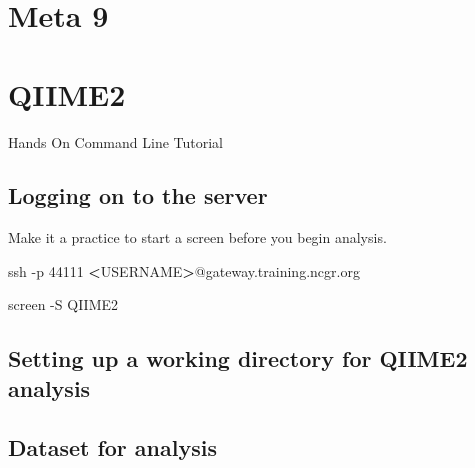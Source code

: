 \documentclass[
]{book}
\newenvironment{Shaded}{\begin{snugshade}}{\end{snugshade}}
\newcommand{\AttributeTok}[1]{\textcolor[rgb]{0.77,0.63,0.00}{#1}}
\newcommand{\BuiltInTok}[1]{#1}
\newcommand{\ExtensionTok}[1]{#1}
\newcommand{\FunctionTok}[1]{\textcolor[rgb]{0.00,0.00,0.00}{#1}}
\newcommand{\NormalTok}[1]{#1}
\newcommand{\OperatorTok}[1]{\textcolor[rgb]{0.81,0.36,0.00}{\textbf{#1}}}
\newcommand{\VariableTok}[1]{\textcolor[rgb]{0.00,0.00,0.00}{#1}}
\begin{document}
\hypertarget{meta-9}{%
\chapter{Meta 9}\label{meta-9}}

\hypertarget{qiime2}{%
\chapter{QIIME2}\label{qiime2}}

Hands On Command Line Tutorial

\hypertarget{logging-on-to-the-server}{%
\section{Logging on to the server}\label{logging-on-to-the-server}}

Make it a practice to start a screen before you begin analysis.

\begin{Shaded}
\begin{Highlighting}[]
\FunctionTok{ssh} \AttributeTok{{-}p}\NormalTok{ 44111 }\OperatorTok{\textless{}}\NormalTok{USERNAME}\OperatorTok{\textgreater{}}\NormalTok{@gateway.training.ncgr.org}

\ExtensionTok{screen} \AttributeTok{{-}S}\NormalTok{ QIIME2}
\end{Highlighting}
\end{Shaded}

\hypertarget{setting-up-a-working-directory-for-qiime2-analysis}{%
\section{Setting up a working directory for QIIME2 analysis}\label{setting-up-a-working-directory-for-qiime2-analysis}}

\begin{Shaded}
\end{Shaded}

\hypertarget{dataset-for-analysis}{%
\section{Dataset for analysis}\label{dataset-for-analysis}}
\end{document}
